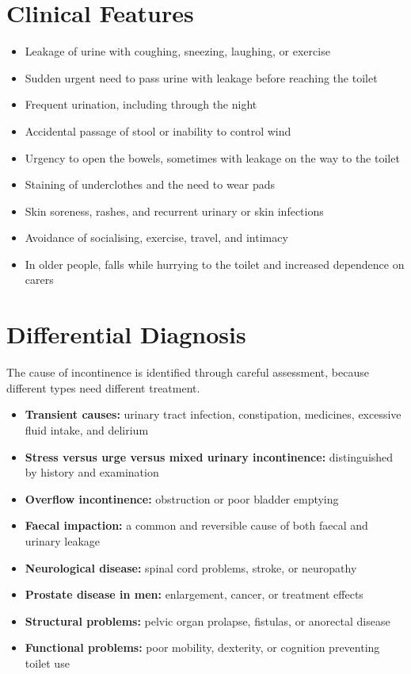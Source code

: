 \section*{Clinical Features}
\begin{itemize}
    \item Leakage of urine with coughing, sneezing, laughing, or exercise
    \item Sudden urgent need to pass urine with leakage before reaching the toilet
    \item Frequent urination, including through the night
    \item Accidental passage of stool or inability to control wind
    \item Urgency to open the bowels, sometimes with leakage on the way to the toilet
    \item Staining of underclothes and the need to wear pads
    \item Skin soreness, rashes, and recurrent urinary or skin infections
    \item Avoidance of socialising, exercise, travel, and intimacy
    \item In older people, falls while hurrying to the toilet and increased dependence on carers
\end{itemize}

\section*{Differential Diagnosis}
The cause of incontinence is identified through careful assessment, because different types need different treatment.
\begin{itemize}
    \item \textbf{Transient causes:} urinary tract infection, constipation, medicines, excessive fluid intake, and delirium
    \item \textbf{Stress versus urge versus mixed urinary incontinence:} distinguished by history and examination
    \item \textbf{Overflow incontinence:} obstruction or poor bladder emptying
    \item \textbf{Faecal impaction:} a common and reversible cause of both faecal and urinary leakage
    \item \textbf{Neurological disease:} spinal cord problems, stroke, or neuropathy
    \item \textbf{Prostate disease in men:} enlargement, cancer, or treatment effects
    \item \textbf{Structural problems:} pelvic organ prolapse, fistulas, or anorectal disease
    \item \textbf{Functional problems:} poor mobility, dexterity, or cognition preventing toilet use
\end{itemize}

